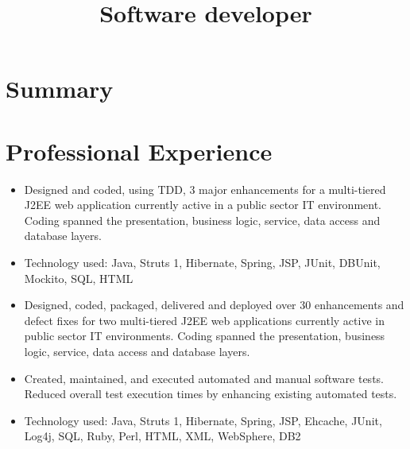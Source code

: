 \documentclass[11pt,letterpaper,sans]{moderncv}   %
\title{Software developer}               %
\begin{document}
\maketitle

\section{Summary}

\section{Professional Experience}
{\begin{itemize}%
\item Designed and coded, using TDD, 3 major enhancements for a multi-tiered
J2EE web application currently active in a public sector IT environment.
Coding spanned the presentation, business logic, service, data access and
database layers. 
\item Technology used: Java, Struts 1, Hibernate, Spring, JSP, JUnit,
DBUnit, Mockito, SQL, HTML
\end{itemize}}

{\begin{itemize}%
\item Designed, coded, packaged, delivered and deployed over 30 enhancements
and defect fixes for two multi-tiered J2EE web applications currently active in
public sector IT environments.
Coding spanned the presentation, business logic, service, data access and
database layers.
\item Created, maintained, and executed automated and manual software tests.
Reduced overall test execution times by enhancing existing automated tests.
\item Technology used: Java, Struts 1, Hibernate, Spring, JSP, Ehcache, JUnit,
Log4j, SQL, Ruby, Perl, HTML, XML, WebSphere, DB2
\end{itemize}}
\end{document}
